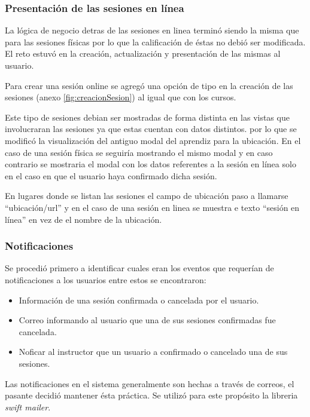 \subsubsection{Presentación de las sesiones en línea }

La lógica de negocio detras de las sesiones en linea terminó siendo la misma que para las sesiones físicas por lo que la calificación de éstas no debió ser modificada. El reto estuvó en la creación, actualización y presentación de las mismas al usuario.

Para crear una sesión online se agregó una opción de tipo en la creación de las sesiones (anexo \ref{fig:creacionSesion}) al igual que con los cursos.

Este tipo de sesiones debian ser mostradas de forma distinta en las vistas que involucraran las sesiones ya que estas cuentan con datos distintos. por lo que se modificó la visualización del antiguo modal del aprendiz para la ubicación. En el caso de una sesión física se seguiría mostrando el mismo modal y en caso contrario se mostraria el modal con los datos referentes a la sesión en línea solo en el caso en que el usuario haya confirmado dicha sesión.

En lugares donde se listan las sesiones el campo de ubicación paso a llamarse ``ubicación/url'' y en el caso de una sesión en linea se muestra e texto ``sesión en línea'' en vez de el nombre de la ubicación. 

\subsubsection{Notificaciones}

Se procedió primero a identificar cuales eran los eventos que requerían de notificaciones a los usuarios entre estos se encontraron:

\begin{itemize}
	\item Información de una sesión confirmada o cancelada por el usuario.
	\item Correo informando al usuario que una de sus sesiones confirmadas fue cancelada.
	\item Noficar al instructor que un usuario a confirmado o cancelado una de sus sesiones.
\end{itemize}

Las notificaciones en el sistema generalmente son hechas a través de correos, el pasante decidió mantener ésta práctica. Se utilizó para este propósito la libreria \emph{swift mailer}.

